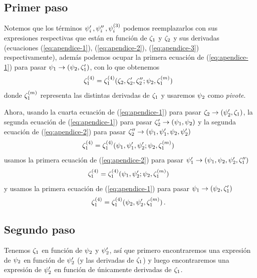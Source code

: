 \documentclass[%
 aip,
 jmp,%
 amsmath,amssymb,
 reprint,%
]{revtex4-2}
\begin{document}
{\subsection{Primer paso}
Notemos que los términos $\psi_i'\,,\psi_i''\,,\psi_i^{(3)}$ podemos reemplazarlos con sus expresiones respectivas que están en función de $\zeta_1$ y $\zeta_2$ y sus derivadas (ecuaciones (\ref{eq:apendice-1}), (\ref{eq:apendice-2}), (\ref{eq:apendice-3}) respectivamente), además podemos ocupar la primera ecuación de (\ref{eq:apendice-1}) para pasar $\psi_1\rightarrow (\psi_2,\zeta_1')$, con lo que obtenemos
\begin{equation}
     \zeta_1^{(4)}=\zeta_1^{(4)}(\zeta_2,\zeta_2',\zeta_2'';\psi_2,\zeta_1^{(m)})
\end{equation}
donde $\zeta_1^{(m)}$ representa las distintas derivadas de $\zeta_1$ y usaremos $\psi_2$ como \textit{pivote}.

Ahora, usando la cuarta ecuación de (\ref{eq:apendice-1}) para pasar $\zeta_2\rightarrow (\psi_2',\zeta_1)$, la segunda ecuación de (\ref{eq:apendice-1}) para pasar $\zeta_2'\rightarrow (\psi_1,\psi_2)$ y la segunda ecuación de (\ref{eq:apendice-2}) para pasar $\zeta_2''\rightarrow (\psi_1,\psi_1',\psi_2,\psi_2')$
\begin{equation}
    \zeta_1^{(4)}=\zeta_1^{(4)}(\psi_1,\psi_1',\psi_2';\psi_2,\zeta_1^{(m)})
\end{equation}
usamos la primera ecuación de (\ref{eq:apendice-2}) para pasar $\psi_1'\rightarrow (\psi_1,\psi_2,\psi_2',\zeta_1'')$
\begin{equation}
    \zeta_1^{(4)}=\zeta_1^{(4)}(\psi_1,\psi_2';\psi_2,\zeta_1^{(m)})
\end{equation}
y usamos la primera ecuación de (\ref{eq:apendice-1}) para pasar $\psi_1\rightarrow (\psi_2,\zeta_1')$
\begin{equation}\label{eq:z_1^4}
    \zeta_1^{(4)}=\zeta_1^{(4)}(\psi_2,\psi_2',\zeta_1^{(m)})\,.
\end{equation}

\subsection{Segundo paso}
Tenemos $\zeta_1$ en función de $\psi_2$ y $\psi_2'$, así que primero encontraremos una expresión de $\psi_2$ en función de $\psi_2'$ (y las derivadas de $\zeta_1$) y luego encontraremos una expresión de $\psi_2'$ en función de únicamente derivadas de $\zeta_1$.

}
\end{document}

